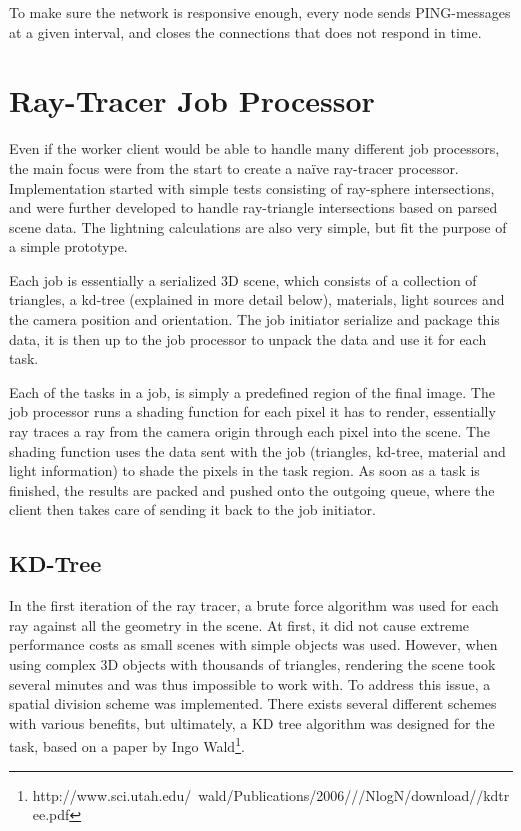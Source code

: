 
To make sure the network is responsive enough, every node sends PING-messages at a given interval, and closes the connections that does not respond in time.

\section{Ray-Tracer Job Processor}
Even if the worker client would be able to handle many different job processors, the main focus were from the start to create a naïve ray-tracer processor. Implementation started with simple tests consisting of ray-sphere intersections, and were further developed to handle ray-triangle intersections based on parsed scene data. The lightning calculations are also very simple, but fit the purpose of a simple prototype.

Each job is essentially a serialized 3D scene, which consists of a collection of triangles, a kd-tree (explained in more detail below), materials, light sources and the camera position and orientation. The job initiator serialize and package this data, it is then up to the job processor to unpack the data and use it for each task.

Each of the tasks in a job, is simply a predefined region of the final image. The job processor runs a shading function for each pixel it has to render, essentially ray traces a ray from the camera origin through each pixel into the scene. The shading function uses the data sent with the job (triangles, kd-tree, material and light information) to shade the pixels in the task region. As soon as a task is finished, the results are packed and pushed onto the outgoing queue, where the client then takes care of sending it back to the job initiator.

\subsection{KD-Tree}
In the first iteration of the ray tracer, a brute force algorithm was used for each ray against all the geometry in the scene. At first, it did not cause extreme performance costs as small scenes with simple objects was used. However, when using complex 3D objects with thousands of triangles, rendering the scene took several minutes and was thus impossible to work with. To address this issue, a spatial division scheme was implemented. There exists several different schemes with various benefits, but ultimately, a KD tree algorithm was designed for the task, based on a paper by Ingo Wald\footnote{http://www.sci.utah.edu/~wald/Publications/2006///NlogN/download//kdtree.pdf}. 

